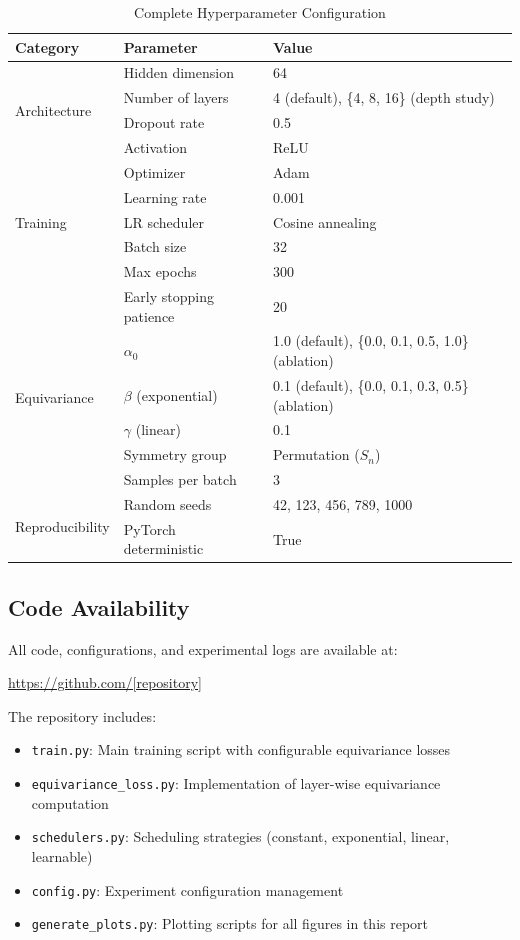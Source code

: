 \documentclass[11pt,a4paper]{article}
\begin{document}
\begin{table}[H]
\centering
\caption{Complete Hyperparameter Configuration}
\begin{tabular}{lll}
\toprule
\textbf{Category} & \textbf{Parameter} & \textbf{Value} \\
\midrule
\multirow{4}{*}{Architecture}
 & Hidden dimension & 64 \\
 & Number of layers & 4 (default), \{4, 8, 16\} (depth study) \\
 & Dropout rate & 0.5 \\
 & Activation & ReLU \\
\midrule
\multirow{5}{*}{Training}
 & Optimizer & Adam \\
 & Learning rate & 0.001 \\
 & LR scheduler & Cosine annealing \\
 & Batch size & 32 \\
 & Max epochs & 300 \\
 & Early stopping patience & 20 \\
\midrule
\multirow{4}{*}{Equivariance}
 & $\alpha_0$ & 1.0 (default), \{0.0, 0.1, 0.5, 1.0\} (ablation) \\
 & $\beta$ (exponential) & 0.1 (default), \{0.0, 0.1, 0.3, 0.5\} (ablation) \\
 & $\gamma$ (linear) & 0.1 \\
 & Symmetry group & Permutation ($S_n$) \\
 & Samples per batch & 3 \\
\midrule
\multirow{2}{*}{Reproducibility}
 & Random seeds & 42, 123, 456, 789, 1000 \\
 & PyTorch deterministic & True \\
\bottomrule
\end{tabular}
\end{table}

\subsection{Code Availability}

All code, configurations, and experimental logs are available at:
\begin{center}
\url{https://github.com/[repository]}
\end{center}

The repository includes:
\begin{itemize}
    \item \texttt{train.py}: Main training script with configurable equivariance losses
    \item \texttt{equivariance\_loss.py}: Implementation of layer-wise equivariance computation
    \item \texttt{schedulers.py}: Scheduling strategies (constant, exponential, linear, learnable)
    \item \texttt{config.py}: Experiment configuration management
    \item \texttt{generate\_plots.py}: Plotting scripts for all figures in this report
\end{itemize}
\end{document}
